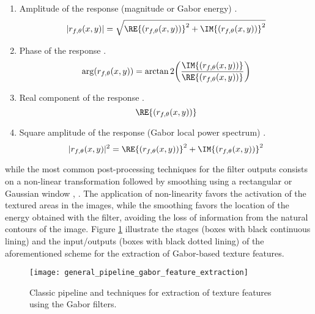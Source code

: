 \begin{enumerate}
    \item Amplitude of the response (magnitude or Gabor energy) \citep{Bovik.Clark.ea:TPAMI:1990}.
        \begin{equation}\label{eq:gabor_magnitude}
            |r_{f, \theta}(x,y)| = \sqrt{\RE{(r_{f, \theta}(x, y))}^2 + \IM{(r_{f, \theta}(x, y))}^2}
        \end{equation}
    \item Phase of the response \citep{Palm.Lehmann:MGV:2002}.
    \begin{equation}\label{eq:gabor_phase}
            \arg(r_{f, \theta}(x,y)) = \arctan2{\left(\frac{\IM{(r_{f, \theta}(x, y))}}{\RE{(r_{f, \theta}(x, y))}}\right)}
        \end{equation}
    \item Real component of the response \citep{Jain.Farrokhnia:IJPR:1991}.
    \begin{equation}\label{eq:gabor_real_part}
            \RE{(r_{f, \theta}(x, y))}
        \end{equation}
    \item Square amplitude of the response (Gabor local power spectrum) \citep{Grigorescu.Petkov.ea:TIP:2002}.
    \begin{equation}\label{eq:gabor_power}
            |r_{f, \theta}(x,y)|^2 = \RE{(r_{f, \theta}(x, y))}^2 + \IM{(r_{f, \theta}(x, y))}^2
        \end{equation}
\end{enumerate}
while the most common post-processing techniques for the filter outputs consists on a non-linear transformation followed by smoothing using a rectangular or Gaussian window \citep{Randen.Husoy:TPAMI:1999}, \citep{Clausi.EdJernigan:JPR:2000}. The application of non-linearity favors the activation of the textured areas in the images, while the smoothing favors the location of the energy obtained with the filter, avoiding the loss of information from the natural contours of the image. Figure \ref{fig:general_pipeline_gabor_feature_extraction} illustrate the stages (boxes with black continuous lining) and the input/outputs (boxes with black dotted lining) of the aforementioned scheme for the extraction of Gabor-based texture features.

\begin{figure}[!ht]
	\centering
	\texttt{[image: general\_pipeline\_gabor\_feature\_extraction]}
	\caption{Classic pipeline and techniques for extraction of texture features using the Gabor filters.}\label{fig:general_pipeline_gabor_feature_extraction}
\end{figure}


